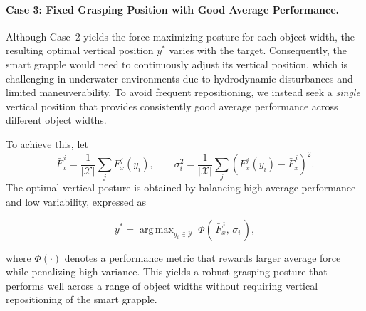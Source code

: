 \documentclass[a4paper,11pt]{article}
\DeclareMathOperator*{\argmax}{arg\,max}
\begin{document}
\paragraph{Case 3: Fixed Grasping Position with Good Average Performance.}
Although Case~2 yields the force-maximizing posture for each object width, the resulting optimal vertical position $y^{*}$ varies with the target. Consequently, the smart grapple would need to continuously adjust its vertical position, which is challenging in underwater environments due to hydrodynamic disturbances and limited maneuverability. To avoid frequent repositioning, we instead seek a \emph{single} vertical position that provides consistently good average performance across different object widths.

To achieve this, let  %
\[
    \bar{F}_x^{\,i} = \frac{1}{|\mathcal{X}|}\sum_{j} F_x^j(y_i), 
    \qquad
    \sigma_i^2 = \frac{1}{|\mathcal{X}|}\sum_{j} \left(F_x^j(y_i)-\bar{F}_x^{\,i}\right)^2.
\]
The optimal vertical posture is obtained by balancing high average performance and low variability, expressed as

\begin{equation}
    y^{*} = \argmax_{y_i\in\mathcal{Y}} \; \Phi(\,\bar{F}_x^{\,i},\,\sigma_i\,),
\end{equation}

where $\Phi(\cdot)$ denotes a performance metric that rewards larger average force while penalizing high variance. This yields a robust grasping posture that performs well across a range of object widths without requiring vertical repositioning of the smart grapple.
\end{document}
